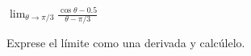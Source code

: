 \item $\displaystyle \lim_{\theta \to \pi/3} \frac{\cos \theta - 0.5}{\theta - \pi/3}$
\par
Exprese el límite como una derivada y calcúlelo.
